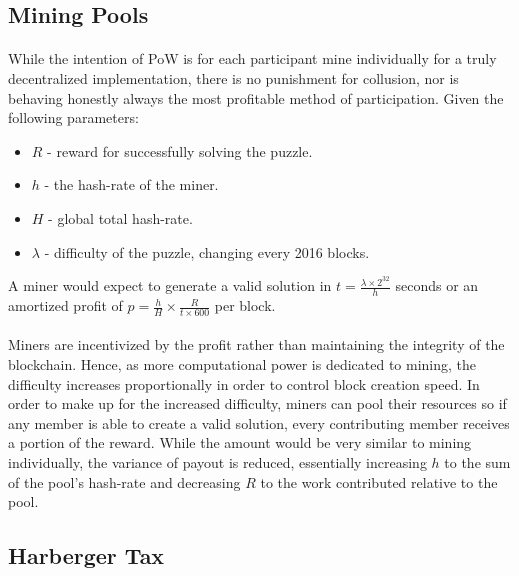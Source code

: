 
\subsection{Mining Pools}

\paragraph{} While the intention of PoW is for each participant mine individually for a truly decentralized implementation, there is no punishment for collusion, nor is behaving honestly always the most profitable method of participation. Given the following parameters:

\begin{itemize}
  \item $R$ - reward for successfully solving the puzzle.
  \item $h$ - the hash-rate of the miner.
  \item $H$ - global total hash-rate.
  \item $\lambda$ - difficulty of the puzzle, changing every 2016 blocks.
\end{itemize}

\noindent A miner would expect to generate a valid solution in $t = \frac{\lambda \times 2^{32}}{h}$ \cite{difficulty2019} seconds or an amortized profit of $p = \frac{h}{H} \times \frac{R}{t \times 600}$ per block.

\paragraph{} Miners are incentivized by the profit rather than maintaining the integrity of the blockchain. Hence, as  more computational power is dedicated to mining, the difficulty increases proportionally in order to control block creation speed. In order to make up for the increased difficulty, miners can pool their resources so if any member is able to create a valid solution, every contributing member receives a portion of the reward. While the amount would be very similar to mining individually, the variance of payout is reduced, essentially increasing $h$ to the sum of the pool's hash-rate and decreasing $R$ to the work contributed relative to the pool.

\subsection{Harberger Tax} \label{section:harbergerstax}

